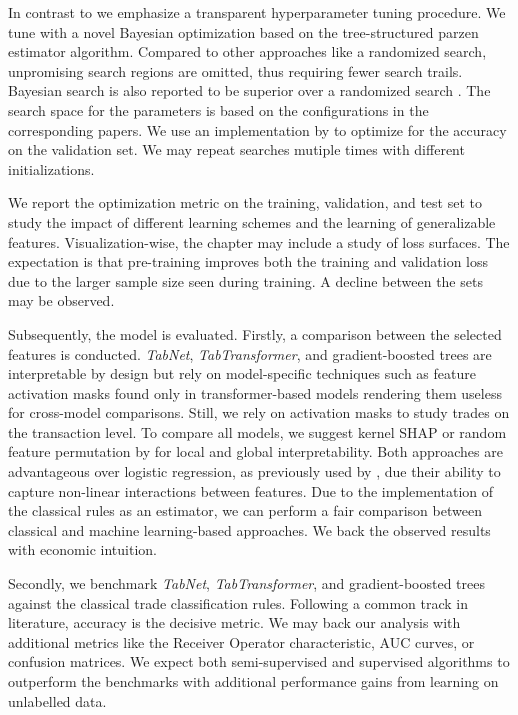 In contrast to \textcite{ronenMachineLearningTrade2022} we emphasize a transparent hyperparameter tuning procedure. We tune with a novel Bayesian optimization based on the tree-structured parzen estimator algorithm. Compared to other approaches like a randomized search, unpromising search regions are omitted, thus requiring fewer search trails. Bayesian search is also reported to be superior over a randomized search \autocite{turnerBayesianOptimizationSuperior2021}. The search space for the parameters is based on the configurations in the corresponding papers. We use an implementation by \textcite{akibaOptunaNextgenerationHyperparameter2019} to optimize for the accuracy on the validation set. We may repeat searches mutiple times with different initializations.

We report the optimization metric on the training, validation, and test set to study the impact of different learning schemes and the learning of generalizable features. Visualization-wise, the chapter may include a study of loss surfaces. The expectation is that pre-training improves both the training and validation loss due to the larger sample size seen during training. A decline between the sets may be observed.

Subsequently, the model is evaluated. Firstly, a comparison between the selected features is conducted. \textit{TabNet}, \textit{TabTransformer}, and gradient-boosted trees are interpretable by design but rely on model-specific techniques such as feature activation masks found only in transformer-based models rendering them useless for cross-model comparisons. Still, we rely on activation masks to study trades on the transaction level. To compare all models, we suggest kernel \gls{SHAP} \autocite{lundbergUnifiedApproachInterpreting2017} or random feature permutation by \textcite{breimanRandomForests2001} for local and global interpretability. Both approaches are advantageous over logistic regression, as previously used by \textcites{savickasInferringDirectionOption2003}{chakrabartyTradeClassificationAlgorithms2012}, due their ability to capture non-linear interactions between features. Due to the implementation of the classical rules as an estimator, we can perform a fair comparison between classical and machine learning-based approaches. We back the observed results with economic intuition.

Secondly, we benchmark \textit{TabNet}, \textit{TabTransformer}, and gradient-boosted trees against the classical trade classification rules. Following a common track in literature, accuracy is the decisive metric. We may back our analysis with additional metrics like the Receiver Operator characteristic, \gls{AUC} curves, or confusion matrices. We expect both semi-supervised and supervised algorithms to outperform the benchmarks with additional performance gains from learning on unlabelled data.

